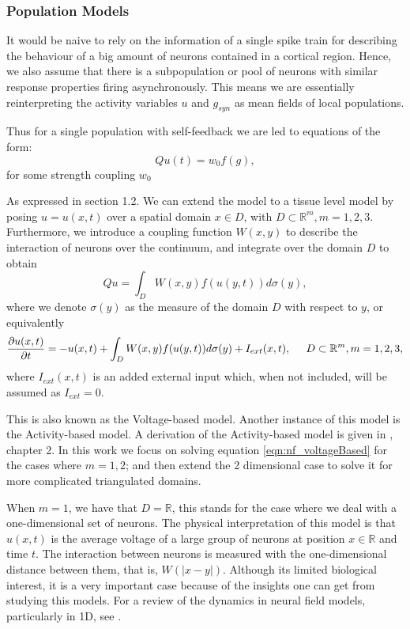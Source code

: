 \documentclass{uonmathreport}
\begin{document}
\subsubsection{Population Models}
\label{subsubsection:Population Models}

It would be naive to rely on the information of a single spike train for describing the behaviour of a big amount of neurons contained in a cortical region. Hence, we also assume that there is a subpopulation or pool of neurons with similar response properties firing asynchronously. This means we are essentially reinterpreting the activity variables $u$ and $g_{syn}$ as mean fields of local populations.

Thus for a single population with self-feedback we are led to equations of the form:
\begin{equation}
Qu(t) = w_0f(g),
\end{equation}
for some strength coupling $w_0$

As expressed in \cite{coombes2012NeuralFields} section 1.2. We can extend the model to a tissue level model by posing $u = u(x,t)$ over a spatial domain $x \in D$, with $D \subset \mathbb{R}^m, m = 1,2,3$. Furthermore, we introduce a coupling function $W(x,y)$ to describe the interaction of neurons over the continuum, and integrate over the domain $D$ to obtain
\begin{equation}
Qu = \int_{D} W(x,y) f(u(y,t)) d\sigma(y),
\end{equation}
where we denote $\sigma(y)$ as the measure of the domain $D$ with respect to $y$, or equivalently
\begin{equation} \label{eqn:nf_voltageBased}
\frac{\partial u(x,t)}{\partial t} = -u(x,t) + \int_{D} W(x,y) f(u(y,t)) d\sigma(y) + I_{ext}(x,t), \hspace{5mm} D \subset \mathbb{R}^m, m = 1,2,3,
\end{equation}
where $I_{ext}(x,t)$ is an added external input which, when not included, will be assumed as $I_{ext} = 0$.
 
This is also known as the Voltage-based model. Another instance of this model is the Activity-based model. A derivation of the Activity-based model is given in \cite{bressloff2011spatiotemporal}, chapter 2. In this work we focus on solving equation \ref{eqn:nf_voltageBased} for the cases where $m = 1,2$; and then extend the 2 dimensional case to solve it for more complicated triangulated domains.

When $m=1$, we have that $D = \mathbb{R}$, this stands for the case where we deal with a one-dimensional set of neurons. The physical interpretation of this model is that $u(x,t)$ is the average voltage of a large group of neurons at position $ x \in \mathbb{R}$ and time $t$. The interaction between neurons is measured with the one-dimensional distance between them, that is, $W(|x-y|)$. Although its limited biological interest, it is a very important case because of the insights one can get from studying this models. For a review of the dynamics in neural field models, particularly in 1D, see \cite{coombes2005waves}.
\end{document}
